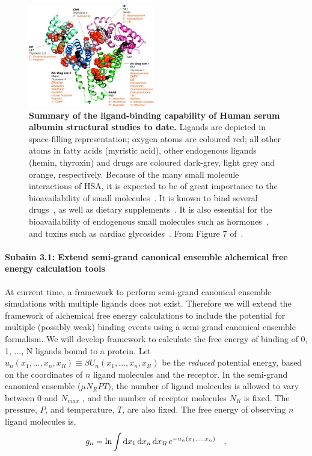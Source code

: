 \documentclass[10pt,final]{article}
\newcommand{\subsubsubsection}[1]{\paragraph*{#1}}
\begin{document}
\begin{figure}[H]
	\centering	
	\includegraphics[width=0.49\textwidth]{figures/hsa_fig7_ghuman2005.jpg}
	\caption{\textbf{Summary of the ligand-binding capability of Human serum albumin structural studies to date.} Ligands are depicted in space-filling representation; oxygen atoms are coloured red; all other atoms in fatty acids (myristic acid), other endogenous ligands (hemin, thyroxin) and drugs are coloured dark-grey, light grey and orange, respectively. Because of the many small molecule interactions of HSA, it is expected to be of great importance to the bioavailability of small molecules~\cite{Metcalfe2010a}. It is known to bind several drugs~\cite{SJOeHOLM1979a,Bannwarth1996a,Sulkowska2002a,Ghuman2005a,Perez2007a}, as well as dietary supplements~\cite{Pal2013a}. It is also essential for the bioavailability of endogenous small molecules such as hormones~\cite{Pardridge1986a}, and toxins such as cardiac glycosides~\cite{Smith1985a}. From Figure 7 of~\cite{Ghuman2005a}.
}
	\label{figure:albumin}
\end{figure} 



\subsubsubsection{Subaim 3.1: Extend semi-grand canonical ensemble alchemical free energy calculation tools}
At current time, a framework to perform semi-grand canonical ensemble simulations with multiple ligands does not exist.
%
Therefore we will extend the framework of alchemical free energy calculations to include the potential for multiple (possibly weak) binding events using a semi-grand canonical ensemble formalism. 
%
We will develop framework to calculate the free energy of binding of 0, 1, $\dots$, N ligands bound to a protein.
%
Let $u_n(x_1,\ldots,x_n,x_R) \equiv \beta U_n(x_1,\ldots,x_n,x_R)$ be the \emph{reduced} potential energy, based on the coordinates of  $n$ ligand molecules and the receptor.
%
In the semi-grand canonical ensemble ($\mu N_R PT)$, the number of ligand molecules is allowed to vary between 0 and $N_{max}$ , and the number of receptor molecules $N_R$ is fixed.
%
The pressure, $P$, and temperature, $T$, are also fixed. The free energy of observing $n$ ligand molecules is,
\begin{align}
 g_n = \ln \int \dif x_1 \dif x_n \dif x_R \, e^{-u_n(x_1,\dots,x_n)} \quad,
\end{align}
\end{document}

